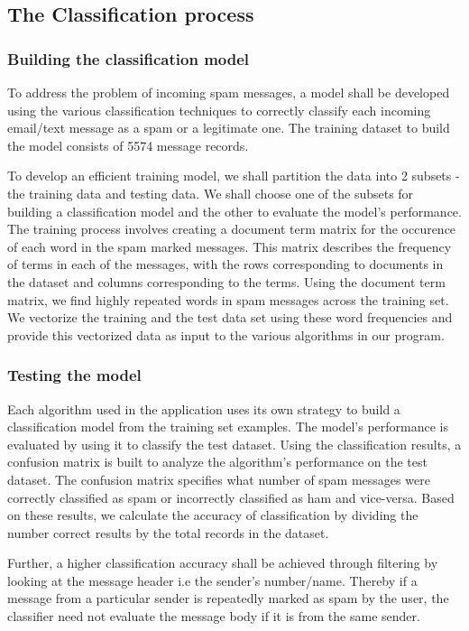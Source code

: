 \documentclass[9pt,twocolumn,twoside]{../../styles/osajnl}
\begin{document}
\subsection{The Classification process}

\subsubsection{Building the classification model}

To address the problem of incoming spam messages, a model shall be
developed using the various classification techniques to correctly
classify each incoming email/text message as a spam or a legitimate
one. The training dataset to build the
model consists of 5574 message records.

To develop an efficient training model, we shall partition the data
into 2 subsets - the training data and testing data. We shall choose
one of the subsets for building a classification model and the other
to evaluate the model's performance. The training process involves
creating a document term matrix for the occurence of each word in the
spam marked messages. This matrix describes the frequency of terms in
each of the messages, with the rows corresponding to documents in the
dataset and columns corresponding to the terms.  Using the document
term matrix, we find highly repeated words in spam messages across the
training set. We vectorize the training and the test data set using
these word frequencies and provide this vectorized data as input to
the various algorithms in our program.

\subsubsection{Testing the model}

Each algorithm used in the application uses its own strategy to build
a classification model from the training set examples. The model's
performance is evaluated by using it to classify the test
dataset. Using the classification results, a confusion
matrix is built to analyze the algorithm's performance on the test dataset.
The confusion matrix specifies what number of spam messages were
correctly classified as spam or incorrectly classified as ham and
vice-versa. Based on these results, we calculate the accuracy of
classification by dividing the number correct results by the total
records in the dataset.

Further, a higher classification accuracy shall be achieved through
filtering by looking at the message header i.e the sender's
number/name. Thereby if a message from a particular sender is
repeatedly marked as spam by the user, the classifier need not
evaluate the message body if it is from the same sender.
\end{document}
